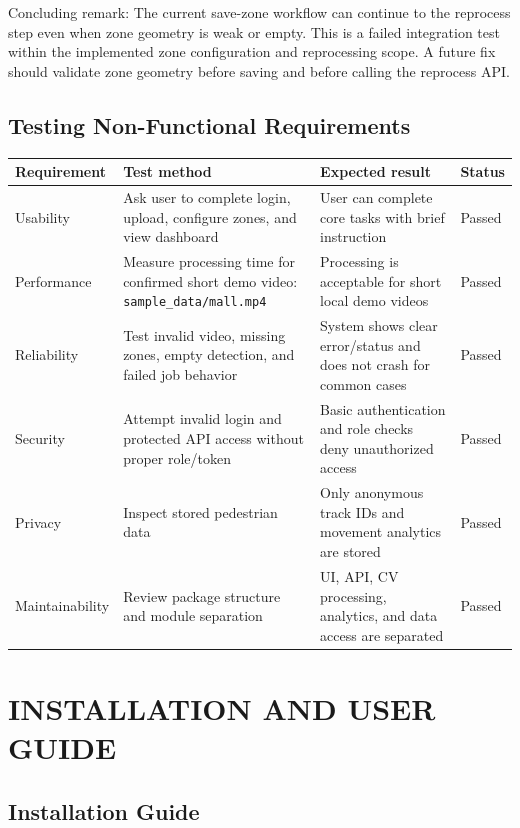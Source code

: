 \documentclass[12pt,a4paper]{report}
\begin{document}
Concluding remark: The current save-zone workflow can continue to the reprocess step even when zone geometry is weak or empty. This is a failed integration test within the implemented zone configuration and reprocessing scope. A future fix should validate zone geometry before saving and before calling the reprocess API.

\section{Testing Non-Functional Requirements}

\begin{longtable}{|p{3.2cm}|p{5.2cm}|p{4.2cm}|p{2.5cm}|}
\hline
\rowcolor{HeaderBlue}
\textbf{Requirement} & \textbf{Test method} & \textbf{Expected result} & \textbf{Status} \\
\hline
Usability & Ask user to complete login, upload, configure zones, and view dashboard & User can complete core tasks with brief instruction & Passed \\
\hline
Performance & Measure processing time for confirmed short demo video: \texttt{sample\_data/mall.mp4} & Processing is acceptable for short local demo videos & Passed \\
\hline
Reliability & Test invalid video, missing zones, empty detection, and failed job behavior & System shows clear error/status and does not crash for common cases & Passed \\
\hline
Security & Attempt invalid login and protected API access without proper role/token & Basic authentication and role checks deny unauthorized access & Passed \\
\hline
Privacy & Inspect stored pedestrian data & Only anonymous track IDs and movement analytics are stored & Passed \\
\hline
Maintainability & Review package structure and module separation & UI, API, CV processing, analytics, and data access are separated & Passed \\
\hline
\end{longtable}

\chapter{INSTALLATION AND USER GUIDE}

\section{Installation Guide}
\end{document}
